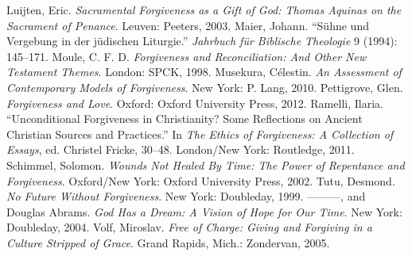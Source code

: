 \documentclass[titlepage]{article}
\begin{document}
\begin{thebibliography}{99}
 Luijten, Eric. \textit{Sacramental Forgiveness as a Gift of God: Thomas Aquinas on the Sacrament of Penance}. Leuven: Peeters, 2003.
 Maier, Johann. “Sühne und Vergebung in der jüdischen Liturgie.” \textit{Jahrbuch für Biblische Theologie} 9 (1994): 145--171.
 Moule, C. F. D. \textit{Forgiveness and Reconciliation: And Other New Testament Themes}. London: SPCK, 1998.
 Musekura, Célestin. \textit{An Assessment of Contemporary Models of Forgiveness}. New York: P. Lang, 2010.
 Pettigrove, Glen. \textit{Forgiveness and Love}. Oxford: Oxford University Press, 2012.
 Ramelli, Ilaria. “Unconditional Forgiveness in Christianity? Some Reflections on Ancient Christian Sources and Practices.” In \textit{The Ethics of Forgiveness: A Collection of Essays}, ed. Christel Fricke, 30--48. London/New York: Routledge, 2011.
 Schimmel, Solomon. \textit{Wounds Not Healed By Time: The Power of Repentance and Forgiveness}. Oxford/New York: Oxford University Press, 2002.
 Tutu, Desmond. \textit{No Future Without Forgiveness}. New York: Doubleday, 1999.
 ———, and Douglas Abrams. \textit{God Has a Dream: A Vision of Hope for Our Time}. New York: Doubleday, 2004.
 Volf, Miroslav. \textit{Free of Charge: Giving and Forgiving in a Culture Stripped of Grace}. Grand Rapids, Mich.: Zondervan, 2005.

\end{thebibliography}
\endgroup
\end{document}
